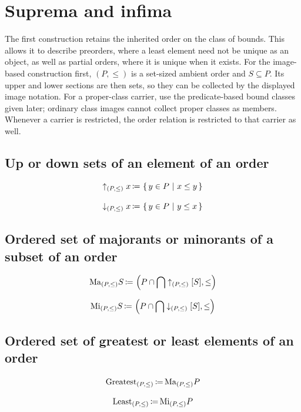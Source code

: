 \def\topic{Supremum \& Infimum}


\section{Suprema and infima}
The first construction retains the inherited order on the class of bounds.
This allows it to describe preorders, where a least element need not be
unique as an object, as well as partial orders, where it is unique when it
exists. For the image-based construction first, $(P,\leq)$ is a set-sized
ambient order and $S\subseteq P$. Its upper and lower sections are then
sets, so they can be collected by the displayed image notation. For a
proper-class carrier, use the predicate-based bound classes given later;
ordinary class images cannot collect proper classes as members. Whenever a carrier is restricted, the order relation is
restricted to that carrier as well.

\subsection{Up or down sets of an element of an order}%
\begin{definition}%
\[
\uparrow_{(P,\leq)}x\,{\coloneqq}\, \left\{\,y\in P\ \middle|\ x\leq y\,\right\}
\]
\end{definition}
\begin{definition}%
\[
\downarrow_{(P,\leq)}x\,{\coloneqq}\, \left\{\,y\in P\ \middle|\ y\leq x\,\right\}
\]
\end{definition}

\subsection{Ordered set of majorants or minorants of a subset of an order}
\begin{definition}
\[
\mathrm{Ma}_{(P,\leq)}S\,{\coloneqq}\, \left(P\cap\bigcap \uparrow_{(P,\leq)}[S],\leq\right)
\]
\end{definition}
\begin{definition}
\[
\mathrm{Mi}_{(P,\leq)}S\,{\coloneqq}\, \left(P\cap\bigcap \downarrow_{(P,\leq)}[S],\leq\right)
\]
\end{definition}
\subsection{Ordered set of greatest or least elements of an order}
\begin{definition}
\[
\mathrm{Greatest}_{(P,\leq)}\,{\coloneqq}\, \mathrm{Ma}_{(P,\leq)}P
\]
\end{definition}
\begin{definition}
\[
\mathrm{Least}_{(P,\leq)}\,{\coloneqq}\, \mathrm{Mi}_{(P,\leq)}P
\]
\end{definition}
